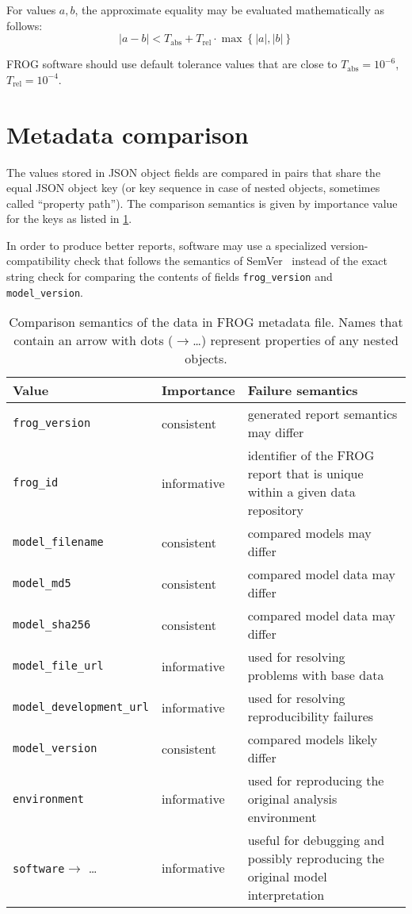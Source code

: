 For values $a, b$, the approximate equality may be evaluated mathematically as follows:
\[|a-b|<T_{\text{abs}} + T_{\text{rel}}\cdot \max\left\{|a|, |b|\right\} \]

FROG software should use default tolerance values that are close to $T_\text{abs}=10^{-6}$, $T_\text{rel}=10^{-4}$.

\section{Metadata comparison}

The values stored in JSON object fields are compared in pairs that share the equal JSON object key (or key sequence in case of nested objects, sometimes called ``property path'').
The comparison semantics is given by importance value for the keys as listed in \cref{tab:cmpmeta}.

In order to produce better reports, software may use a specialized version-compatibility check that follows the semantics of SemVer~\cite{semver} instead of the exact string check for comparing the contents of fields \verb|frog_version| and \verb|model_version|.

\begin{table}\tablefont
\begin{tabular}{llp{30em}}
\toprule
Value & Importance & Failure semantics \\
\midrule
\verb|frog_version|
 & consistent
 & generated report semantics may differ
 \\
\verb|frog_id|
 & informative
 & identifier of the FROG report that is unique within a given data repository
 \\
\verb|model_filename|
 & consistent
 & compared models may differ
 \\
\verb|model_md5|
 & consistent
 & compared model data may differ
 \\
\verb|model_sha256|
 & consistent
 & compared model data may differ
 \\
\verb|model_file_url|
 & informative
 & used for resolving problems with base data
 \\
\verb|model_development_url|
 & informative
 & used for resolving reproducibility failures
 \\
\verb|model_version|
 & consistent
 & compared models likely differ
 \\
\verb|environment|
 & informative
 & used for reproducing the original analysis environment
 \\
\verb|software|$\to$ \dots
 & informative
 & useful for debugging and possibly reproducing the original model interpretation
 \\
\bottomrule
\end{tabular}
\caption[Comparison semantics of FROG metadata file.]{Comparison semantics of the data in FROG metadata file. Names that contain an arrow with dots ($\to$\dots) represent properties of any nested objects.}
\label{tab:cmpmeta}
\end{table}

